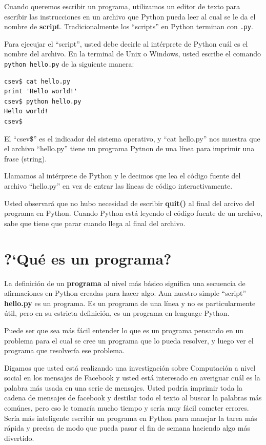 Cuando queremos escribir un programa, utilizamos un editor de texto para escribir las instrucciones en un archivo que Python pueda leer al cual se le da el nombre de {\bf script}. Tradicionalmente los ``scripts'' en Python terminan con {\tt .py}.


Para ejecujar el ``script'', usted debe decirle al int\'erprete de Python cu\'al es el nombre del archivo.  
En la terminal de Unix o Windows, usted escribe el comando {\tt python hello.py} de la siguiente manera:

\beforeverb
\begin{verbatim}
csev$ cat hello.py
print 'Hello world!'
csev$ python hello.py
Hello world!
csev$
\end{verbatim}
\afterverb
%
El ``csev\$'' es el indicador del sistema operativo, y ``cat hello.py'' nos muestra que el archivo 
``hello.py'' tiene un programa Pytnon de una l\'inea para imprimir una frase (string).

Llamamos al int\'erprete de Python y le decimos que lea el c\'odigo fuente del archivo
``hello.py'' en vez de entrar las l\'ineas de c\'odigo interactivamente.

Usted observar\'a que no hubo necesidad de escribir {\bf quit()} al final del arcivo del programa 
en Python. Cuando Python est\'a leyendo el c\'odigo fuente de un archivo, sabe que tiene que parar cuando llega al final del archivo.

\section{?`Qu\'e es un programa?}

La definici\'on de un {\bf programa} al nivel m\'as b\'asico significa una secuencia de afirmaciones en Python creadas para hacer algo.
Aun nuestro simple ``script'' {\bf hello.py}  es un programa. Es un programa de una l\'inea y no es particularmente \'util, pero en su estricta definici\'on, es un programa en lenguage Python.

Puede ser que sea m\'as f\'acil entender lo que es un programa pensando en un problema para el cual se cree un programa que lo pueda resolver, y luego ver el programa que resolver\'ia ese problema.

Digamos que usted est\'a realizando una investigaci\'on sobre Computaci\'on a nivel social en los mensajes de Facebook y usted est\'a interesado en averiguar cu\'al es la palabra m\'as usada en una serie de mensajes.
Usted podr\'ia imprimir toda la cadena de mensajes de facebook y destilar todo el texto al buscar la palabras m\'as com\'unes, pero eso le tomar\'ia mucho tiempo y ser\'ia muy f\'acil cometer errores. Ser\'ia m\'as inteligente escribir un programa en Python para manejar la tarea m\'as r\'apida y precisa de modo que pueda pasar el fin de semana haciendo algo m\'as divertido.

